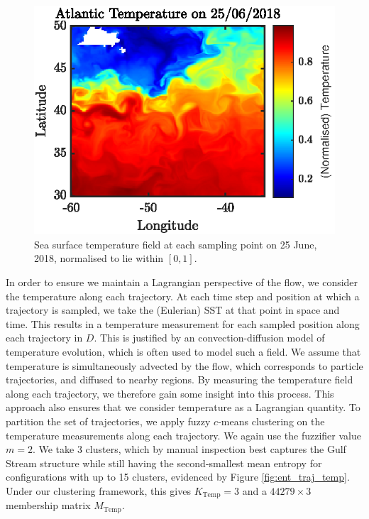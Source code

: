 \documentclass[a4paper, fontsize=12pt]{article}
\begin{document}
\begin{figure}
\begin{center}
	\includegraphics[scale = 1]{../figures/atlantic_temp.eps}
	\caption{Sea surface temperature field at each sampling point on 25 June, 2018, normalised to lie within \([0,1]\).}
	\label{fig:atlantic_temp}
\end{center}
\end{figure}
In order to ensure we maintain a Lagrangian perspective of the flow, we consider the temperature along each trajectory. At each time step and position at which a trajectory is sampled, we take the (Eulerian) SST at that point in space and time. This results in a temperature measurement for each sampled position along each trajectory in \(D\). This is justified by an convection-diffusion model of temperature evolution, which is often used to model such a field. We assume that temperature is simultaneously advected by the flow, which corresponds to particle trajectories, and diffused to nearby regions. By measuring the temperature field along each trajectory, we therefore gain some insight into this process. This approach also ensures that we consider temperature as a Lagrangian quantity. To partition the set of trajectories, we apply fuzzy \(c\)-means clustering on the temperature measurements along each trajectory. We again use the fuzzifier value \(m = 2\). We take 3 clusters, which by manual inspection best captures the Gulf Stream structure while still having the second-smallest mean entropy for configurations with up to 15 clusters, evidenced by Figure \ref{fig:ent_traj_temp}. Under our clustering framework, this gives \(K_{\text{Temp}} = 3\) and a \(44279\times3\) membership matrix \(M_{\text{Temp}}\).
\end{document}
